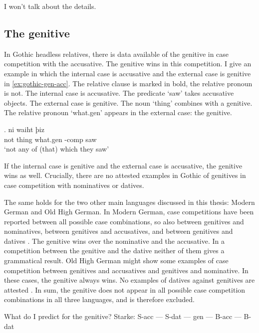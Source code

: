 I won't talk about the details.

\subsection{The genitive}\label{sec:genitive}

In Gothic headless relatives, there is data available of the genitive in case competition with the accusative. The genitive wins in this competition.
I give an example in which the internal case is accusative and the external case is genitive in \ref{ex:gothic-gen-acc}.
The relative clause is marked in bold, the relative pronoun is not.
The internal case is accusative. The predicate  `saw' takes accusative objects.
The external case is genitive. The noun  `thing' combines with a genitive.
The relative pronoun  `what.\ac{gen}' appears in the external case: the genitive.

\exg. ni waiht þiz  \\
 not thing\scsub{[gen]} what.\ac{gen} -\ac{comp} saw\scsub{[acc]}\\
 `not any of (that) which they saw' \label{ex:gothic-gen-acc}

If the internal case is genitive and the external case is accusative, the genitive wins as well. Crucially, there are no attested examples in Gothic of genitives in case competition with nominatives or datives.

The same holds for the two other main languages discussed in this thesis: Modern German and Old High German.
In Modern German, case competitions have been reported between all possible case combinations, so also between genitives and nominatives, between genitives and accusatives, and between genitives and datives \citep[cf.][]{vogel2001}. The genitive wins over the nominative and the accusative. In a competition between the genitive and the dative neither of them gives a grammatical result.
Old High German might show some examples of case competition between genitives and accusatives and genitives and nominative. In these cases, the genitive always wins. No examples of datives against genitives are attested \citep{behaghel1923}.
In sum, the genitive does not appear in all possible case competition combinations in all three languages, and is therefore excluded.

What do I predict for the genitive? Starke: S-acc --- S-dat --- gen --- B-acc --- B-dat

